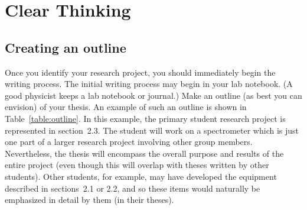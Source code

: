 \chapter{Clear Thinking}
\label{chap:ClearThinking}

\section{Creating an outline}
\label{sec:Outline} 

Once you identify your research project, you should immediately
begin the writing process. The initial writing process may begin in
your lab notebook. (A good physicist keeps a lab notebook or
journal.) Make an outline (as best you can envision) of your thesis.
An example of such an outline is shown in Table~\ref{table:outline}.
In this example, the primary student research project is represented
in section~2.3. The student will work on a spectrometer which is
just one part of a larger research project involving other group
members. Nevertheless, the thesis will encompass the overall purpose
and results of the entire project (even though this will overlap
with theses written by other students). Other students, for example,
may have developed the equipment described in sections~2.1 or 2.2,
and so these items would naturally be emphasized in detail by them
(in their theses).

